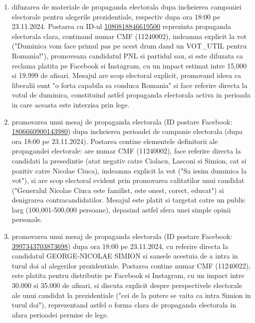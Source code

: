\documentclass[a4paper,12pt]{article}
\begin{document}
\begin{enumerate}[leftmargin=*, label=\arabic*.)]
    \item difuzarea de materiale de propaganda electorala dupa incheierea campaniei electorale pentru alegerile prezidentiale, respectiv dupa ora 18:00 pe 23.11.2024. Postarea cu ID-ul \href{https://www.facebook.com/ads/library/?id=1080818846619500}{1080818846619500} reprezinta propaganda electorala clara, continand numar CMF (11240002), indeamna explicit la vot ("Duminica vom face primul pas pe acest drum dand un VOT\_UTIL pentru Romania!"), promoveaza candidatul PNL si partidul sau, si este difuzata ca reclama platita pe Facebook si Instagram, cu un impact estimat intre 15.000 si 19.999 de afisari. Mesajul are scop electoral explicit, promovand ideea ca liberalii sunt "o forta capabila sa conduca Romania" si face referire directa la votul de duminica, constituind astfel propaganda electorala activa in perioada in care aceasta este interzisa prin lege.
    \item promovarea unui mesaj de propaganda electorala (ID postare Facebook: \href{https://www.facebook.com/ads/library/?id=1806660900143980}{1806660900143980}) dupa incheierea perioadei de campanie electorala (dupa ora 18:00 pe 23.11.2024). Postarea contine elementele definitorii ale propagandei electorale: are numar CMF (11240002), face referire directa la candidati la presedintie (atat negativ catre Ciolacu, Lasconi si Simion, cat si pozitiv catre Nicolae Ciuca), indeamna explicit la vot ("Sa iesim duminica la vot"), si are scop electoral evident prin promovarea calitatilor unui candidat ("Generalul Nicolae Ciuca este familist, este onest, corect, educat") si denigrarea contracandidatilor. Mesajul este platit si targetat catre un public larg (100,001-500,000 persoane), depasind astfel sfera unei simple opinii personale.
    \item promovarea unui mesaj de propaganda electorala (ID postare Facebook: \href{https://www.facebook.com/ads/library/?id=3997343703873698}{3997343703873698}) dupa ora 18:00 pe 23.11.2024, cu referire directa la candidatul GEORGE-NICOLAE SIMION si sansele acestuia de a intra in turul doi al alegerilor prezidentiale. Postarea contine numar CMF (11240022), este platita pentru distributie pe Facebook si Instagram, cu un impact intre 30.000 si 35.000 de afisari, si discuta explicit despre perspectivele electorale ale unui candidat la prezidentiale ("cei de la putere se vaita ca intra Simion in turul doi"), reprezentand astfel o forma clara de propaganda electorala in afara perioadei permise de lege.

\end{enumerate}
\end{document}
